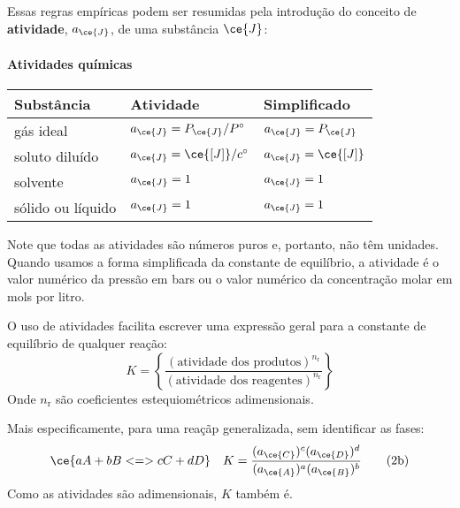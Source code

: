 Essas regras empíricas podem ser resumidas pela introdução do conceito de \textbf{atividade}, \(a_{\ce{J}}\), de uma substância \(\ce{J}\):

\begin{displaytable}

\paragraph{Atividades químicas}

\begin{longtable}[]{@{}lll@{}}
\toprule
\textbf{Substância} & \textbf{Atividade} & \textbf{Simplificado} \\
\midrule
\endhead
\bottomrule
\endlastfoot
gás ideal & \(a_{\ce{J}} = P_{\ce{J}}/P^\circ\) & \(a_{\ce{J}} = P_{\ce{J}}\) \\
soluto diluído & \(a_{\ce{J}} = \ce{[J]}/c^\circ\) & \(a_{\ce{J}} = \ce{[J]}\) \\
solvente & \(a_{\ce{J}} = 1\) & \(a_{\ce{J}} = 1\) \\
sólido ou líquido & \(a_{\ce{J}} = 1\) & \(a_{\ce{J}} = 1\) \\
\end{longtable}

\end{displaytable}

Note que todas as atividades são números puros e, portanto, não têm unidades. Quando usamos a forma simplificada da constante de equilíbrio, a
atividade é o valor numérico da pressão em bars ou o valor numérico da concentração molar em mols por litro.

O uso de atividades facilita escrever uma expressão geral para a constante de equilíbrio de qualquer reação: \[
    K = \left\{ \dfrac{ (\text{atividade dos produtos})^{n_\mathrm{r}} }{ (\text{atividade dos reagentes})^{n_\mathrm{r}} } \right\}
\tag{2a}
\] Onde \(n_\mathrm{r}\) são coeficientes estequiométricos adimensionais.

Mais especificamente, para uma reaçãp generalizada, sem identificar as fases: \[
    \ce{a A + b B <=> c C + d D } 
        \quad K = \dfrac{ (a_{\ce{C}})^c (a_{\ce{D}})^d }{ (a_{\ce{A}})^a (a_{\ce{B}})^b }
\tag{2b}
\] Como as atividades são adimensionais, \(K\) também é.


